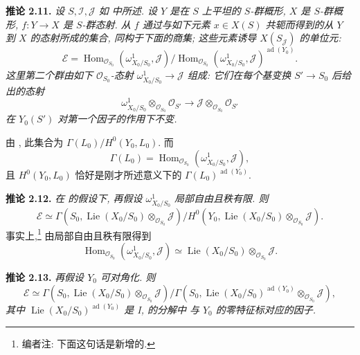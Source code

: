 \medskip
\noindent{}\textbf{推论 2.11.}
\textit{设 \(S,\mathscr I,\mathscr J\) 如
 中所述.
设 \(Y\) 是在 \(S\) 上平坦的 \(S\)-群概形,
\(X\) 是 \(S\)-群概形, \(f:Y\to X\) 是 \(S\)-群态射.
从 \(f\) 通过与如下元素 \(x\in X(S)\) 共轭而得到的从 \(Y\)
到 \(X\) 的态射所成的集合, 同构于下面的商集;
这些元素诱导 \(X(S_{\mathscr J})\) 的单位元:}
\[
 \mathcal E=
 \operatorname{Hom}_{\mathscr O_{S_0}}(\omega^1_{X_0/S_0},\mathscr J)
 \big/
 \operatorname{Hom}_{\mathscr O_{S_0}}(\omega^1_{X_0/S_0},\mathscr J)
 ^{\operatorname{ad}(Y_0)}.
\]
\textit{这里第二个群由如下 \(\mathscr O_{S_0}\)-态射
\(\omega^1_{X_0/S_0}\to\mathscr J\) 组成: 它们在每个基变换
\(S'\to S_0\) 后给出的态射}
\[
 \omega^1_{X_0/S_0}\otimes_{\mathscr O_{S_0}}\mathscr O_{S'}
 \longrightarrow
 \mathscr J\otimes_{\mathscr O_{S_0}}\mathscr O_{S'}
\]
\textit{在 \(Y_0(S')\) 对第一个因子的作用下不变.}

由 ,
此集合为 \(\Gamma(L_0)/H^0(Y_0,L_0)\). 而
\[
 \Gamma(L_0)=
 \operatorname{Hom}_{\mathscr O_{S_0}}(\omega^1_{X_0/S_0},\mathscr J),
\]
且 \(H^0(Y_0,L_0)\) 恰好是刚才所述意义下的
\(\Gamma(L_0)^{\operatorname{ad}(Y_0)}\).

\medskip
\noindent{}\textbf{推论 2.12.}
\textit{在  的假设下,
再假设 \(\omega^1_{X_0/S_0}\) 局部自由且秩有限. 则}
\[
 \mathcal E\simeq
 \Gamma\!\left(S_0,
  \operatorname{Lie}(X_0/S_0)\otimes_{\mathscr O_{S_0}}\mathscr J
 \right)
 \big/
 H^0\!\left(Y_0,
  \operatorname{Lie}(X_0/S_0)\otimes_{\mathscr O_{S_0}}\mathscr J
 \right).
\]
事实上,\footnote{编者注: 下面这句话是新增的.}
由局部自由且秩有限得到
\[
 \operatorname{Hom}_{\mathscr O_{S_0}}
 (\omega^1_{X_0/S_0},\mathscr J)
 \simeq
 \operatorname{Lie}(X_0/S_0)\otimes_{\mathscr O_{S_0}}\mathscr J.
\]

\medskip
\noindent{}\textbf{推论 2.13.}
\textit{再假设 \(Y_0\) 可对角化. 则}
\[
 \mathcal E\simeq
 \Gamma\!\left(S_0,
  \operatorname{Lie}(X_0/S_0)\otimes_{\mathscr O_{S_0}}\mathscr J
 \right)
 \big/
 \Gamma\!\left(S_0,
  \operatorname{Lie}(X_0/S_0)^{\operatorname{ad}(Y_0)}
  \otimes_{\mathscr O_{S_0}}\mathscr J
 \right),
\]
\textit{其中
\(\operatorname{Lie}(X_0/S_0)^{\operatorname{ad}(Y_0)}\) 是
I,  的分解中
与 \(Y_0\) 的零特征标对应的因子.}

